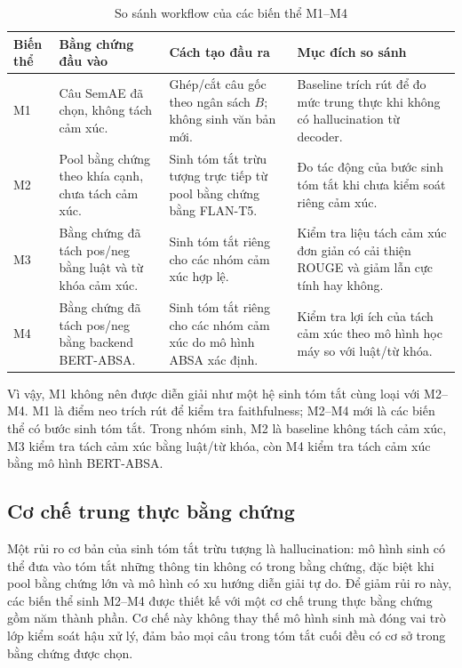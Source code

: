 \documentclass[12pt,a4paper]{report}
\begin{document}
\begin{table}[tbp]
\centering
\caption{So sánh workflow của các biến thể M1--M4}
\label{tab:m1-m4-workflow}
\small
\begin{tabularx}{\textwidth}{l L{0.24\textwidth} L{0.23\textwidth} Y}
\toprule
\textbf{Biến thể} & \textbf{Bằng chứng đầu vào} & \textbf{Cách tạo đầu ra} & \textbf{Mục đích so sánh} \\
\midrule
M1 & Câu SemAE đã chọn, không tách cảm xúc. & Ghép/cắt câu gốc theo ngân sách $B$; không sinh văn bản mới. & Baseline trích rút để đo mức trung thực khi không có hallucination từ decoder. \\
M2 & Pool bằng chứng theo khía cạnh, chưa tách cảm xúc. & Sinh tóm tắt trừu tượng trực tiếp từ pool bằng chứng bằng FLAN-T5. & Đo tác động của bước sinh tóm tắt khi chưa kiểm soát riêng cảm xúc. \\
M3 & Bằng chứng đã tách pos/neg bằng luật và từ khóa cảm xúc. & Sinh tóm tắt riêng cho các nhóm cảm xúc hợp lệ. & Kiểm tra liệu tách cảm xúc đơn giản có cải thiện ROUGE và giảm lẫn cực tính hay không. \\
M4 & Bằng chứng đã tách pos/neg bằng backend BERT-ABSA. & Sinh tóm tắt riêng cho các nhóm cảm xúc do mô hình ABSA xác định. & Kiểm tra lợi ích của tách cảm xúc theo mô hình học máy so với luật/từ khóa. \\
\bottomrule
\end{tabularx}
\end{table}

Vì vậy, M1 không nên được diễn giải như một hệ sinh tóm tắt cùng loại với M2--M4. M1 là điểm neo trích rút để kiểm tra faithfulness; M2--M4 mới là các biến thể có bước sinh tóm tắt. Trong nhóm sinh, M2 là baseline không tách cảm xúc, M3 kiểm tra tách cảm xúc bằng luật/từ khóa, còn M4 kiểm tra tách cảm xúc bằng mô hình BERT-ABSA.

\subsection{Cơ chế trung thực bằng chứng}

Một rủi ro cơ bản của sinh tóm tắt trừu tượng là hallucination: mô hình sinh có thể đưa vào tóm tắt những thông tin không có trong bằng chứng, đặc biệt khi pool bằng chứng lớn và mô hình có xu hướng diễn giải tự do. Để giảm rủi ro này, các biến thể sinh M2--M4 được thiết kế với một cơ chế trung thực bằng chứng gồm năm thành phần. Cơ chế này không thay thế mô hình sinh mà đóng vai trò lớp kiểm soát hậu xử lý, đảm bảo mọi câu trong tóm tắt cuối đều có cơ sở trong bằng chứng được chọn.
\end{document}
